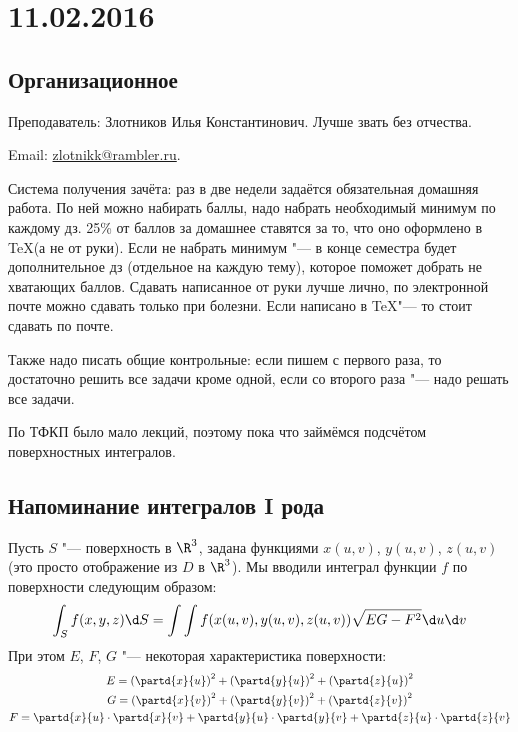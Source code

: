 
\chapter{11.02.2016}

\section{Организационное}
Преподаватель: Злотников Илья Константинович.
Лучше звать без отчества.

Email: \href{mailto:zlotnikk@rambler.ru}{zlotnikk@rambler.ru}.

Система получения зачёта: раз в две недели задаётся обязательная домашняя работа.
По ней можно набирать баллы, надо набрать необходимый минимум по каждому дз.
25\% от баллов за домашнее ставятся за то, что оно оформлено в \TeX (а не от руки).
Если не набрать минимум "--- в конце семестра будет дополнительное дз (отдельное на каждую тему),
которое поможет добрать не хватающих баллов.
Сдавать написанное от руки лучше лично, по электронной почте можно сдавать только при болезни.
Если написано в \TeX "--- то стоит сдавать по почте.

Также надо писать общие контрольные: если пишем с первого раза, то достаточно решить все задачи кроме одной,
если со второго раза "--- надо решать все задачи.

По ТФКП было мало лекций, поэтому пока что займёмся подсчётом поверхностных интегралов.

\section{Напоминание интегралов I рода}
Пусть $S$ "--- поверхность в $\R^3$, задана функциями $x(u, v)$, $y(u, v)$, $z(u, v)$
(это просто отображение из $D$ в $\R^3$).
Мы вводили интеграл функции $f$ по поверхности следующим образом:
\begin{equation}\label{int_surf_I}
	\int_{S} f(x, y, z) \d S =
	\int\int f(x(u, v), y(u, v), z(u, v)) \sqrt{EG-F^2} \d u \d v
\end{equation}
При этом $E$, $F$, $G$ "--- некоторая характеристика поверхности:
\begin{gather*}
	E=\left(\partd{x}{u}\right)^2 + \left(\partd{y}{u}\right)^2 + \left(\partd{z}{u}\right)^2 \\
	G=\left(\partd{x}{v}\right)^2 + \left(\partd{y}{v}\right)^2 + \left(\partd{z}{v}\right)^2 \\
	F=\partd{x}{u} \cdot \partd{x}{v} + \partd{y}{u} \cdot \partd{y}{v} + \partd{z}{u} \cdot \partd{z}{v}
\end{gather*}

